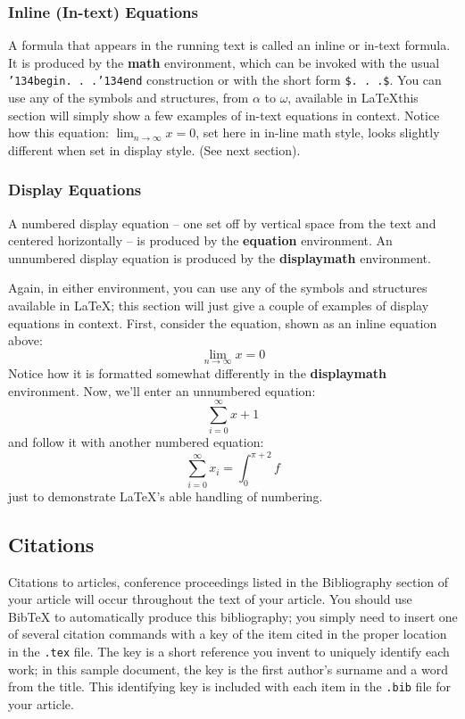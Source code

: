 \documentclass{acm_proc_article-sp}
\begin{document}
\subsubsection{Inline (In-text) Equations}
A formula that appears in the running text is called an
inline or in-text formula.  It is produced by the
\textbf{math} environment, which can be
invoked with the usual \texttt{{\char'134}begin. . .{\char'134}end}
construction or with the short form \texttt{\$. . .\$}. You
can use any of the symbols and structures,
from $\alpha$ to $\omega$, available in
\LaTeX this section will simply show a
few examples of in-text equations in context. Notice how
this equation: \begin{math}\lim_{n\rightarrow \infty}x=0\end{math},
set here in in-line math style, looks slightly different when
set in display style.  (See next section).

\subsubsection{Display Equations}
A numbered display equation -- one set off by vertical space
from the text and centered horizontally -- is produced
by the \textbf{equation} environment. An unnumbered display
equation is produced by the \textbf{displaymath} environment.

Again, in either environment, you can use any of the symbols
and structures available in \LaTeX; this section will just
give a couple of examples of display equations in context.
First, consider the equation, shown as an inline equation above:
\begin{equation}\lim_{n\rightarrow \infty}x=0\end{equation}
Notice how it is formatted somewhat differently in
the \textbf{displaymath}
environment.  Now, we'll enter an unnumbered equation:
\begin{displaymath}\sum_{i=0}^{\infty} x + 1\end{displaymath}
and follow it with another numbered equation:
\begin{equation}\sum_{i=0}^{\infty}x_i=\int_{0}^{\pi+2} f\end{equation}
just to demonstrate \LaTeX's able handling of numbering.

\subsection{Citations}
Citations to articles,
conference
proceedings listed
in the Bibliography section of your
article will occur throughout the text of your article.
You should use BibTeX to automatically produce this bibliography;
you simply need to insert one of several citation commands with
a key of the item cited in the proper location in
the \texttt{.tex} file.
The key is a short reference you invent to uniquely
identify each work; in this sample document, the key is
the first author's surname and a
word from the title.  This identifying key is included
with each item in the \texttt{.bib} file for your article.
\end{document}
